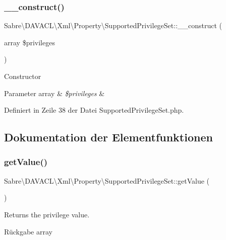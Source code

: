 \subsubsection{\texorpdfstring{\+\_\+\+\_\+construct()}{\_\_construct()}}
{\footnotesize\ttfamily Sabre\textbackslash{}\+D\+A\+V\+A\+C\+L\textbackslash{}\+Xml\textbackslash{}\+Property\textbackslash{}\+Supported\+Privilege\+Set\+::\+\_\+\+\_\+construct (\begin{DoxyParamCaption}\item[{array}]{\$privileges }\end{DoxyParamCaption})}

Constructor


\begin{DoxyParams}[1]{Parameter}
array & {\em \$privileges} & \\
\hline
\end{DoxyParams}


Definiert in Zeile 38 der Datei Supported\+Privilege\+Set.\+php.



\subsection{Dokumentation der Elementfunktionen}
\mbox{\label{class_sabre_1_1_d_a_v_a_c_l_1_1_xml_1_1_property_1_1_supported_privilege_set_af9e45d301c36a7274c4807539ffa3e8b}} 
\subsubsection{\texorpdfstring{get\+Value()}{getValue()}}
{\footnotesize\ttfamily Sabre\textbackslash{}\+D\+A\+V\+A\+C\+L\textbackslash{}\+Xml\textbackslash{}\+Property\textbackslash{}\+Supported\+Privilege\+Set\+::get\+Value (\begin{DoxyParamCaption}{ }\end{DoxyParamCaption})}

Returns the privilege value.

\begin{DoxyReturn}{Rückgabe}
array 
\end{DoxyReturn}


